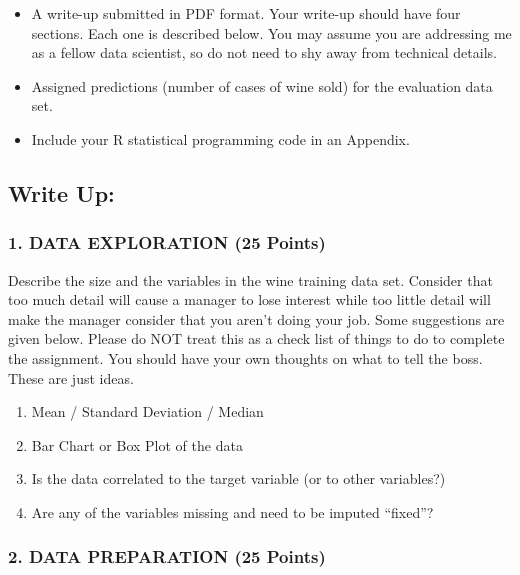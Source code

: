 \documentclass[
]{article}
\providecommand{\tightlist}{%
  \setlength{\itemsep}{0pt}\setlength{\parskip}{0pt}}
\begin{document}
\begin{itemize}
\tightlist
\item
  A write-up submitted in PDF format. Your write-up should have four
  sections. Each one is described below. You may assume you are
  addressing me as a fellow data scientist, so do not need to shy away
  from technical details.
\item
  Assigned predictions (number of cases of wine sold) for the evaluation
  data set.
\item
  Include your R statistical programming code in an Appendix.
\end{itemize}

\hypertarget{write-up}{%
\subsection{Write Up:}\label{write-up}}

\hypertarget{data-exploration-25-points}{%
\subsubsection{1. DATA EXPLORATION (25
Points)}\label{data-exploration-25-points}}

Describe the size and the variables in the wine training data set.
Consider that too much detail will cause a manager to lose interest
while too little detail will make the manager consider that you aren't
doing your job. Some suggestions are given below. Please do NOT treat
this as a check list of things to do to complete the assignment. You
should have your own thoughts on what to tell the boss. These are just
ideas.

\begin{enumerate}
\def\labelenumi{\alph{enumi}.}
\tightlist
\item
  Mean / Standard Deviation / Median
\item
  Bar Chart or Box Plot of the data
\item
  Is the data correlated to the target variable (or to other variables?)
\item
  Are any of the variables missing and need to be imputed ``fixed''?
\end{enumerate}

\hypertarget{data-preparation-25-points}{%
\subsubsection{2. DATA PREPARATION (25
Points)}\label{data-preparation-25-points}}
\end{document}
